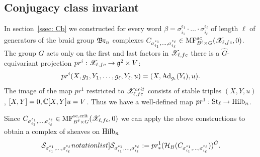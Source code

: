 
\subsection{Conjugacy class invariant} In section~\ref{ssec: Cb} we constructed for every word $\beta=\sigma_{i_1}^{\epsilon_1}\cdot\dots\cdot\sigma_{i_\ell}^{\epsilon_\ell}$
of length $\ell$ of generators of the braid group $\mathfrak{Br}_n$  complexes $C_{\sigma_{i_1}^{\epsilon_1},\dots,\sigma_{i_\ell}^{\epsilon_\ell}}\in
\mathrm{MF}^{sc}_{B^\ell\times G}(\mathscr{X}_{\ell,fc},0)$. The group \(\hat{G}\) acts only on the first and last factors in \(\mathscr{X}_{\ell,fc}\) there is a \(\hat{G}\)-equivariant projection 
\(pr^{i}:\mathscr{X}_{\ell,fc}\rightarrow \mathfrak{g}^2\times V\):
\[pr^i(X,g_1,Y_1,\dots,g_\ell,Y_\ell,u)=(X,{\rm Ad}_{g_i}(Y_i),u).\]
The image of the map \(pr^1\) restricted to \(\mathscr{X}^{crit}_{\ell,fc}\) consists of stable triples \((X,Y,u)\), \([X,Y]=0,\mathbb{C}[X,Y]u=V\). Thus we have a well-defined map
\(pr^1:\mathrm{St}_\ell\to \mathrm{Hilb}_n\).

Since $C_{\sigma_{i_1}^{\epsilon_1},\dots,\sigma_{i_\ell}^{\epsilon_\ell}}\in \mathrm{MF}^{\mathrm{sc,crit}}_{B^\ell\times G}(\mathscr{X}_{\ell,fc},0)$
we can apply the above constructions
to obtain  a complex of  sheaves on \(\mathrm{Hilb}_n\) \[\SymbolPrint{\calS_{\sigma_{i_1}^{\epsilon_1},\dots,\sigma_{i_\ell}^{\epsilon_\ell}}}:=pr^1_{*}(\calH_{B}(C_{\sigma_{i_1}^{\epsilon_1},\dots,\sigma_{i_\ell}^{\epsilon_\ell}}))^{\hat{G}}.\]


